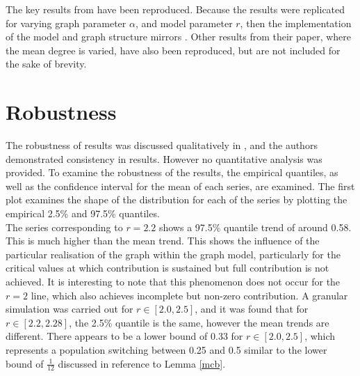 The key results from \cite{RN49} have been reproduced. Because the results were replicated for varying graph parameter $\alpha$, and model parameter $r$, then the implementation of the model and graph structure mirrors \cite{RN49}. Other results from their paper, where the mean degree is varied, have also been reproduced, but are not included for the sake of brevity.


\section{Robustness}
The robustness of results was discussed qualitatively in \cite{RN49}, and the authors demonstrated consistency in results. However no quantitative analysis was provided. To examine the robustness of the results, the empirical quantiles, as well as the confidence interval for the mean of each series, are examined. The first plot examines the shape of the distribution for each of the series by plotting the empirical 2.5\% and 97.5\% quantiles. \\

\FloatBarrier
{}
\FloatBarrier
The series corresponding to $r=2.2$ shows a 97.5\% quantile trend of around 0.58. This is much higher than the mean trend. This shows the influence of the particular realisation of the graph within the graph model, particularly for the critical values at which contribution is sustained but full contribution is not achieved. It is interesting to note that this phenomenon does not occur for the $r=2$ line, which also achieves incomplete but non-zero contribution. A granular simulation was carried out for $r \in [2.0,2.5]$, and it was found that for $r \in [2.2, 2.28]$, the 2.5\% quantile is the same, however the mean trends are different. There appears to be a lower bound of 0.33 for $r \in [2.0, 2.5]$, which represents a population switching between 0.25 and 0.5 similar to the lower bound of $\tfrac{1}{12}$ discussed in reference to Lemma \ref{mcb}.\\

